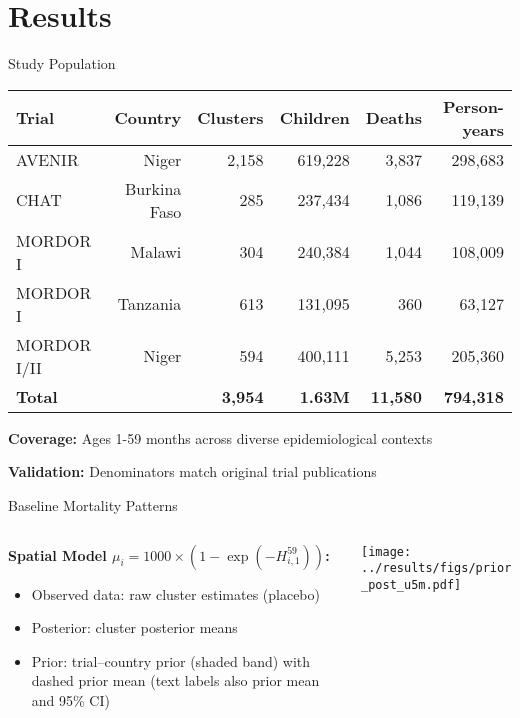 \documentclass[aspectratio=169]{beamer}\usepackage[]{graphicx}\usepackage[dvipsnames]{xcolor}
\begin{document}
\section{Results}

\begin{frame}{Study Population}
\begin{center}
\begin{tabular}{lrrrrr}
\toprule
Trial & Country & Clusters & Children & Deaths & Person-years \\
\midrule
AVENIR & Niger & 2,158 & 619,228 & 3,837 & 298,683 \\
CHAT & Burkina Faso & 285 & 237,434 & 1,086 & 119,139 \\
MORDOR I & Malawi & 304 & 240,384 & 1,044 & 108,009 \\
MORDOR I & Tanzania & 613 & 131,095 & 360 & 63,127 \\
MORDOR I/II & Niger & 594 & 400,111 & 5,253 & 205,360 \\
\midrule
\textbf{Total} & & \textbf{3,954} & \textbf{1.63M} & \textbf{11,580} & \textbf{794,318} \\
\bottomrule
\end{tabular}
\end{center}

\vspace{0.5cm}
\textbf{Coverage:} Ages 1-59 months across diverse epidemiological contexts

\textbf{Validation:} Denominators match original trial publications
\end{frame}

\begin{frame}{Baseline Mortality Patterns}
\begin{columns}
\begin{column}{0.4\textwidth}
\textbf{Spatial Model $\mu_i = 1000 \times (1 - \exp(-H_{i,1}^{59}))$:}
\begin{itemize}
  \item \textcolor{ObsOrange}{Observed data}: raw cluster estimates (placebo)
  \item \textcolor{PostBlue}{Posterior}: cluster posterior means
  \item \textcolor{PriorGray}{Prior}: trial–country prior (shaded band) with
        dashed prior mean (text labels also prior mean and 95\% CI)
\end{itemize}
\end{column}
\begin{column}{0.6\textwidth}
\begin{center}
\texttt{[image: ../results/figs/prior\_post\_u5m.pdf]}
\end{center}
\end{column}
\end{columns}
\end{frame}
\end{document}
